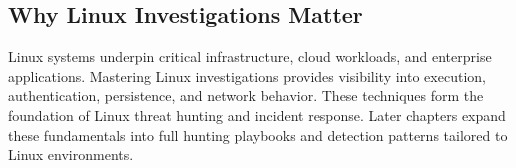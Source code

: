\subsection*{Why Linux Investigations Matter}

Linux systems underpin critical infrastructure, cloud workloads, and enterprise applications. 
Mastering Linux investigations provides visibility into execution, authentication, persistence, and network behavior. 
These techniques form the foundation of Linux threat hunting and incident response. Later chapters expand these fundamentals 
into full hunting playbooks and detection patterns tailored to Linux environments.
